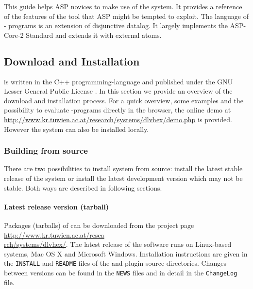 \documentclass[14pt,a4paper, titlepage]{article}
\begin{document}
This guide helps ASP novices to make use of the system. It 
provides a reference of the features of the tool that ASP 
might be tempted to exploit. The language of \hex{}-
programs is an extension of disjunctive datalog. It largely 
implements the ASP-Core-2 Standard \cite{DUMMMY:2} and 
extends it with external atoms. 


\subsection{Download and Installation}
\dlvhex{} is written in the C++ programming-language and published under the GNU Lesser General Public License \cite{licnc}. In this section we provide an overview of the download and installation process. For a quick overview, some examples and the possibility to evaluate \hex{}-programs directly in the browser, the online demo at \url{http://www.kr.tuwien.ac.at/research/systems/dlvhex/demo.php} is provided. However the system can also be installed locally. 

\subsubsection{Building from source}
There are two possibilities to install \dlvhex{} system from source: install the latest stable release of the system or install the latest development version which may not be stable. Both ways are described in following sections.  

\paragraph{Latest release version (tarball)}
\label{sec:steps}
Packages (tarballs) of \dlvhex{} can be downloaded from the project page \url{http://www.kr.tuwien.ac.at/resea} \\ \url{rch/systems/dlvhex/}. The latest release of the software runs on Linux-based systems, Mac OS X and Microsoft Windows. Installation instructions are given in the {\tt INSTALL} and {\tt README} files of the \dlvhex{} and plugin source directories. Changes between versions can be found in the {\tt NEWS} files and in detail in the {\tt ChangeLog} file. 
\end{document}

